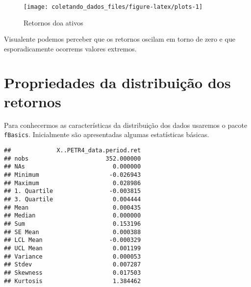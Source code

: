\documentclass[]{article}
\newenvironment{Shaded}{\begin{snugshade}}{\end{snugshade}}
\newcommand{\KeywordTok}[1]{\textcolor[rgb]{0.13,0.29,0.53}{\textbf{{#1}}}}
\newcommand{\NormalTok}[1]{{#1}}
\begin{document}
\begin{figure}[h]

{\centering \texttt{[image: coletando\_dados\_files/figure-latex/plots-1]} 

}

\caption{Retornos doa ativos}\label{fig:plots}
\end{figure}

Visualente podemos perceber que os retornos oscilam em torno de zero e
que esporadicamente ocorrems valores extremos.

\section{Propriedades da distribuição dos
retornos}\label{propriedades-da-distribuicao-dos-retornos}

Para conhecermos as características da distribuição dos dados usaremos o
pacote \texttt{fBasics}. Inicialmente são apresentadas algumas
estatísticas básicas.

\begin{Shaded}
\end{Shaded}

\begin{verbatim}
##             X..PETR4_data.period.ret
## nobs                      352.000000
## NAs                         0.000000
## Minimum                    -0.026943
## Maximum                     0.028986
## 1. Quartile                -0.003815
## 3. Quartile                 0.004444
## Mean                        0.000435
## Median                      0.000000
## Sum                         0.153196
## SE Mean                     0.000388
## LCL Mean                   -0.000329
## UCL Mean                    0.001199
## Variance                    0.000053
## Stdev                       0.007287
## Skewness                    0.017503
## Kurtosis                    1.384462
\end{verbatim}

\begin{Shaded}
\end{Shaded}
\end{document}
